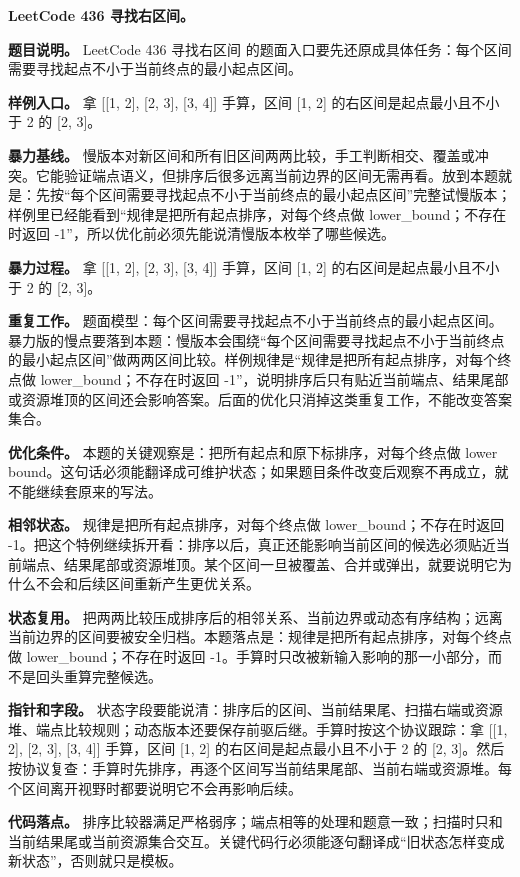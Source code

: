 \noindent\textbf{LeetCode 436 寻找右区间。}

\textbf{题目说明。} LeetCode 436 寻找右区间 的题面入口要先还原成具体任务：每个区间需要寻找起点不小于当前终点的最小起点区间。

\textbf{样例入口。} 拿 [[1, 2], [2, 3], [3, 4]] 手算，区间 [1, 2] 的右区间是起点最小且不小于 2 的 [2, 3]。

\textbf{暴力基线。} 慢版本对新区间和所有旧区间两两比较，手工判断相交、覆盖或冲突。它能验证端点语义，但排序后很多远离当前边界的区间无需再看。放到本题就是：先按“每个区间需要寻找起点不小于当前终点的最小起点区间”完整试慢版本；样例里已经能看到“规律是把所有起点排序，对每个终点做 lower\_bound；不存在时返回 -1”，所以优化前必须先能说清慢版本枚举了哪些候选。

\textbf{暴力过程。} 拿 [[1, 2], [2, 3], [3, 4]] 手算，区间 [1, 2] 的右区间是起点最小且不小于 2 的 [2, 3]。

\textbf{重复工作。} 题面模型：每个区间需要寻找起点不小于当前终点的最小起点区间。暴力版的慢点要落到本题：慢版本会围绕“每个区间需要寻找起点不小于当前终点的最小起点区间”做两两区间比较。样例规律是“规律是把所有起点排序，对每个终点做 lower\_bound；不存在时返回 -1”，说明排序后只有贴近当前端点、结果尾部或资源堆顶的区间还会影响答案。后面的优化只消掉这类重复工作，不能改变答案集合。

\textbf{优化条件。} 本题的关键观察是：把所有起点和原下标排序，对每个终点做 lower bound。这句话必须能翻译成可维护状态；如果题目条件改变后观察不再成立，就不能继续套原来的写法。

\textbf{相邻状态。} 规律是把所有起点排序，对每个终点做 lower\_bound；不存在时返回 -1。把这个特例继续拆开看：排序以后，真正还能影响当前区间的候选必须贴近当前端点、结果尾部或资源堆顶。某个区间一旦被覆盖、合并或弹出，就要说明它为什么不会和后续区间重新产生更优关系。

\textbf{状态复用。} 把两两比较压成排序后的相邻关系、当前边界或动态有序结构；远离当前边界的区间要被安全归档。本题落点是：规律是把所有起点排序，对每个终点做 lower\_bound；不存在时返回 -1。手算时只改被新输入影响的那一小部分，而不是回头重算完整候选。

\textbf{指针和字段。} 状态字段要能说清：排序后的区间、当前结果尾、扫描右端或资源堆、端点比较规则；动态版本还要保存前驱后继。手算时按这个协议跟踪：拿 [[1, 2], [2, 3], [3, 4]] 手算，区间 [1, 2] 的右区间是起点最小且不小于 2 的 [2, 3]。然后按协议复查：手算时先排序，再逐个区间写当前结果尾部、当前右端或资源堆。每个区间离开视野时都要说明它不会再影响后续。

\textbf{代码落点。} 排序比较器满足严格弱序；端点相等的处理和题意一致；扫描时只和当前结果尾或当前资源集合交互。关键代码行必须能逐句翻译成“旧状态怎样变成新状态”，否则就只是模板。

